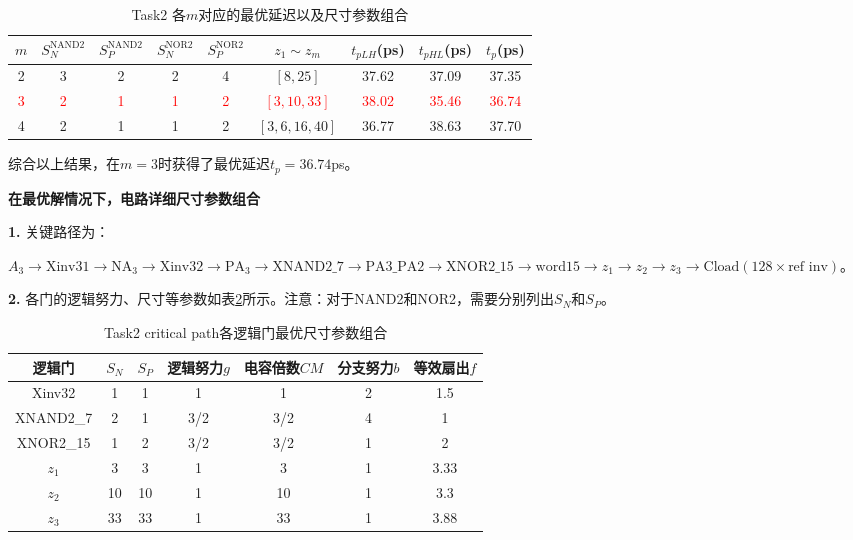 \documentclass[UTF8,12pt,a4paper]{ctexart}
\begin{document}
\begin{table}[htbp]
\centering
\caption{Task2 各$m$对应的最优延迟以及尺寸参数组合}
\label{tab:task2_parc_best_tp}
\begin{tabular}{ccccccccc}
\toprule
$m$ & $S_N^{\text{NAND2}}$ & $S_P^{\text{NAND2}}$ & $S_N^{\text{NOR2}}$ & $S_P^{\text{NOR2}}$ & $z_1 \sim z_m$ &$t_{pLH}$(ps) & $t_{pHL}$(ps) & $t_p$(ps) \\
\midrule
2 & 3 & 2 & 2 & 4 & $[8, 25]$ & 37.62 & 37.09 & 37.35 \\
\textcolor{red}{3} & \textcolor{red}{2} & \textcolor{red}{1} & \textcolor{red}{1} & \textcolor{red}{2} & \textcolor{red}{$[3, 10, 33]$} & \textcolor{red}{38.02} & \textcolor{red}{35.46} & \textcolor{red}{36.74} \\
4 & 2 & 1 & 1 & 2 & $[3, 6, 16, 40]$ & 36.77 & 38.63 & 37.70 \\
\bottomrule
\end{tabular}
\end{table}

综合以上结果，在$m = 3$时获得了最优延迟$t_p = 36.74$ps。

\textbf{在最优解情况下，电路详细尺寸参数组合}

\textbf{1.} 关键路径为：

$A_3 \rightarrow \text{Xinv31} \rightarrow \text{NA}_3 \rightarrow \text{Xinv32} \rightarrow \text{PA}_3 \rightarrow \text{XNAND2\_7} \rightarrow \text{PA3\_PA2} \rightarrow \text{XNOR2\_15} \rightarrow \text{word}15 \rightarrow z_1 \rightarrow z_2 \rightarrow z_3 \rightarrow \text{Cload}(128\times{\text{ref inv}})$。

\textbf{2.} 各门的逻辑努力、尺寸等参数如表\ref{tab:task2_best_gate_params}所示。注意：对于NAND2和NOR2，需要分别列出$S_N$和$S_P$。

\begin{table}[htbp]
\centering
\caption{Task2 critical path各逻辑门最优尺寸参数组合}
\label{tab:task2_best_gate_params}
\begin{tabular}{ccccccc}
\toprule
逻辑门 & $S_N$ & $S_P$ & 逻辑努力$g$ & 电容倍数$CM$ & 分支努力$b$ & 等效扇出$f$ \\
\midrule
Xinv32    & 1  & 1  & 1   & 1    & 2 & 1.5 \\
XNAND2\_7 & 2  & 1  & 3/2 & 3/2  & 4 & 1 \\
XNOR2\_15 & 1  & 2  & 3/2 & 3/2  & 1 & 2 \\
$z_1$     & 3  & 3  & 1   & 3    & 1 & 3.33 \\
$z_2$     & 10 & 10 & 1   & 10   & 1 & 3.3 \\
$z_3$     & 33 & 33 & 1   & 33   & 1 & 3.88 \\
\bottomrule
\end{tabular}
\end{table}
\end{document}
